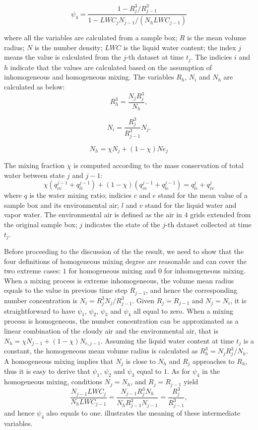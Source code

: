 \begin{equation}
\psi_4 = \frac{1 - R_{j}^3/R_{j-1}^3}{1 - LWC_{j}N_{j-1}/(N_h LWC_{j-1})}
\label{phi4}
\end{equation}

where all the variables are calculated from a sample box; $R$ is the mean volume radius; $N$ is the number density; $LWC$ is the liquid water content; the index $j$ means the value is calculated from the $j$-th dataset at time $t_j$. The indicies $i$ and $h$ indicate that the values are calculated based on the assumption of inhomogeneous and homogeneous mixing. The variables $R_h$, $N_i$ and $N_h$ are calculated as below:
\[
R_h^3 = \frac{N_jR_j^3}{N_h},
\]

\[
N_i = \frac{R_j^3}{R_{j-1}^3}N_j.
\]

\[
N_h = \chi N_j + (1 - \chi) Ne_j
\]

The mixing fraction $\chi$ is computed according to the mass conservation of total water between state $j$ and $j-1$:
\begin{equation}
\chi(q^{j-1}_{vc} + q^{j-1}_{lc}) + (1-\chi)(q^{j-1}_{ve} + q^{j-1}_{le}) = q^{j}_{lc} + q^{j}_{vc}
\end{equation}
where $q$ is the water mixing ratio; indicies $c$ and $e$ stand for the mean 
value of a sample box and its environmental air; $l$ and $v$ stand for the liquid 
water and vapor water. The environmental air is defined as the air in $4$ 
grids extended from the original sample box; $j$ indicates the state of the $j$-th dataset 
collected at time $t_j$.

Before proceeding to the discussion of the the result, we need to show that the 
four definitions of homogeneous mixing degree are reasonable and can cover the 
two extreme cases: $1$ for homogeneous mixing and $0$ for inhomogeneous mixing. 
When a mixing process is extreme inhomogeneous, the volume mean radius equals 
to the value in previous time step $R_{j-1}$, and hence the corresponding number 
concentration is $N_i = R^3_{j}N_j/R^3_{j-1}$. Given $R_j = R_{j-1}$ and 
$N_j = N_i$, it is straightforward to have $\psi_1$, $\psi_2$, $\psi_3$ and $\psi_4$
all equal to zero. When a mixing process is homogeneous, the number concentration can be 
approximated as a linear combination of the cloudy air and the environmental air, that is $N_h = 
\chi N_{j-1} + (1-\chi)N_{e,j-1}$. Assuming the liquid water content at time $t_j$ is a constant, 
the homogeneous mean  volume radius is calculated as $R_h^3 = N_jR_j^3/N_h$. A homogeneous 
mixing implies that $N_j$ is close to $N_h$ and $R_j$ approaches to $R_h$, thus it is 
easy to derive that $\psi_1$, $\psi_2$ and $\psi_3$ equal to $1$. 
As for $\psi_4$ in the homogeneous mixing, conditions $N_j = N_h$, 
and $R_j = R_{j-1}$ yield
\[
\frac{N_{j-1}LWC_j}{N_hLWC_{j-1}} = \frac{N_{j-1}R_j^3N_h}{N_hR_{j-1}^3N_{j-1}}
= \frac{R_j^3}{R_{j-1}^3},
\]
and hence $\psi_4$ also equals to one.  illustrates the meaning of these 
intermediate variables.

